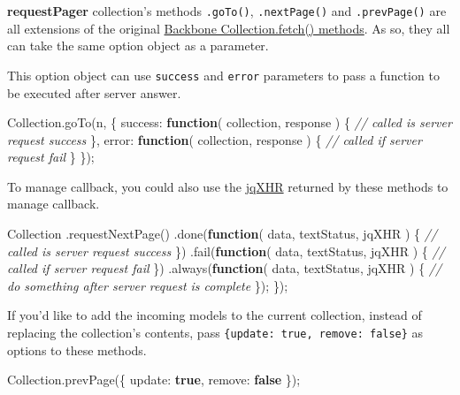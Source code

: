\documentclass[9pt]{book}
\newenvironment{Shaded}{}{}
\newcommand{\KeywordTok}[1]{\textcolor[rgb]{0.00,0.44,0.13}{\textbf{{#1}}}}
\newcommand{\DataTypeTok}[1]{\textcolor[rgb]{0.56,0.13,0.00}{{#1}}}
\newcommand{\CommentTok}[1]{\textcolor[rgb]{0.38,0.63,0.69}{\textit{{#1}}}}
\newcommand{\OtherTok}[1]{\textcolor[rgb]{0.00,0.44,0.13}{{#1}}}
\newcommand{\FunctionTok}[1]{\textcolor[rgb]{0.02,0.16,0.49}{{#1}}}
\newcommand{\NormalTok}[1]{{#1}}
\begin{document}
\textbf{requestPager} collection's methods \texttt{.goTo()},
\texttt{.nextPage()} and \texttt{.prevPage()} are all extensions of the
original
\href{http://documentcloud.github.com/backbone/\#Collection-fetch}{Backbone
Collection.fetch() methods}. As so, they all can take the same option
object as a parameter.

This option object can use \texttt{success} and \texttt{error}
parameters to pass a function to be executed after server answer.

\begin{Shaded}
\begin{Highlighting}[]
\OtherTok{Collection}\NormalTok{.}\FunctionTok{goTo}\NormalTok{(n, \{}
  \DataTypeTok{success}\NormalTok{: }\KeywordTok{function}\NormalTok{( collection, response ) \{}
    \CommentTok{// called is server request success}
  \NormalTok{\},}
  \DataTypeTok{error}\NormalTok{: }\KeywordTok{function}\NormalTok{( collection, response ) \{}
    \CommentTok{// called if server request fail}
  \NormalTok{\}}
\NormalTok{\});}
\end{Highlighting}
\end{Shaded}

To manage callback, you could also use the
\href{http://api.jquery.com/jQuery.ajax/\#jqXHR}{jqXHR} returned by
these methods to manage callback.

\begin{Shaded}
\begin{Highlighting}[]
\NormalTok{Collection}
  \NormalTok{.}\FunctionTok{requestNextPage}\NormalTok{()}
  \NormalTok{.}\FunctionTok{done}\NormalTok{(}\KeywordTok{function}\NormalTok{( data, textStatus, jqXHR ) \{}
    \CommentTok{// called is server request success}
  \NormalTok{\})}
  \NormalTok{.}\FunctionTok{fail}\NormalTok{(}\KeywordTok{function}\NormalTok{( data, textStatus, jqXHR ) \{}
    \CommentTok{// called if server request fail}
  \NormalTok{\})}
  \NormalTok{.}\FunctionTok{always}\NormalTok{(}\KeywordTok{function}\NormalTok{( data, textStatus, jqXHR ) \{}
    \CommentTok{// do something after server request is complete}
  \NormalTok{\});}
\NormalTok{\});}
\end{Highlighting}
\end{Shaded}

If you'd like to add the incoming models to the current collection,
instead of replacing the collection's contents, pass
\texttt{\{update: true, remove: false\}} as options to these methods.

\begin{Shaded}
\begin{Highlighting}[]
\OtherTok{Collection}\NormalTok{.}\FunctionTok{prevPage}\NormalTok{(\{ }\DataTypeTok{update}\NormalTok{: }\KeywordTok{true}\NormalTok{, }\DataTypeTok{remove}\NormalTok{: }\KeywordTok{false} \NormalTok{\});}
\end{Highlighting}
\end{Shaded}
\end{document}
